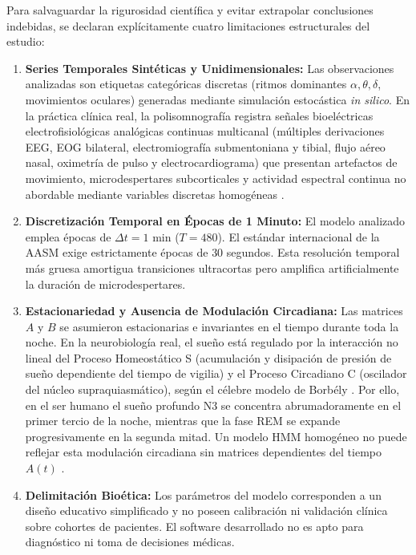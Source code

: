 \documentclass[11pt,a4paper]{article}
\begin{document}
Para salvaguardar la rigurosidad científica y evitar extrapolar conclusiones indebidas, se declaran explícitamente cuatro limitaciones estructurales del estudio:
\begin{enumerate}[leftmargin=*,itemsep=1pt]
    \item \textbf{Series Temporales Sintéticas y Unidimensionales:} Las observaciones analizadas son etiquetas categóricas discretas (ritmos dominantes $\alpha, \theta, \delta$, movimientos oculares) generadas mediante simulación estocástica \textit{in silico}. En la práctica clínica real, la polisomnografía registra señales bioeléctricas electrofisiológicas analógicas continuas multicanal (múltiples derivaciones EEG, EOG bilateral, electromiografía submentoniana y tibial, flujo aéreo nasal, oximetría de pulso y electrocardiograma) que presentan artefactos de movimiento, microdespertares subcorticales y actividad espectral continua no abordable mediante variables discretas homogéneas \cite{iberaasm2007, aasm2020, prerau2017}.
    \item \textbf{Discretización Temporal en Épocas de 1 Minuto:} El modelo analizado emplea épocas de $\Delta t = 1\text{ min}$ ($T=480$). El estándar internacional de la AASM \cite{iberaasm2007, aasm2020} exige estrictamente épocas de 30 segundos. Esta resolución temporal más gruesa amortigua transiciones ultracortas pero amplifica artificialmente la duración de microdespertares.
    \item \textbf{Estacionariedad y Ausencia de Modulación Circadiana:} Las matrices $A$ y $B$ se asumieron estacionarias e invariantes en el tiempo durante toda la noche. En la neurobiología real, el sueño está regulado por la interacción no lineal del Proceso Homeostático S (acumulación y disipación de presión de sueño dependiente del tiempo de vigilia) y el Proceso Circadiano C (oscilador del núcleo supraquiasmático), según el célebre modelo de Borbély \cite{borbely1982}. Por ello, en el ser humano el sueño profundo N3 se concentra abrumadoramente en el primer tercio de la noche, mientras que la fase REM se expande progresivamente en la segunda mitad. Un modelo HMM homogéneo no puede reflejar esta modulación circadiana sin matrices dependientes del tiempo $A(t)$ \cite{prerau2017, flexer2005}.
    \item \textbf{Delimitación Bioética:} Los parámetros del modelo corresponden a un diseño educativo simplificado y no poseen calibración ni validación clínica sobre cohortes de pacientes. El software desarrollado no es apto para diagnóstico ni toma de decisiones médicas.
\end{enumerate}
\end{document}
